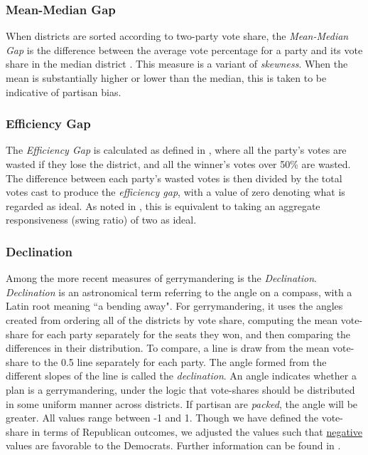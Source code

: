             \subsubsection*{Mean-Median Gap}
    When districts are sorted according to two-party vote share, the \textit{Mean-Median Gap} is the difference between the average vote percentage for a party and its vote share in the median district \citep[see][]{Best2018}. This measure is a variant of \textit{skewness}. When the mean is substantially higher or lower than the median, this is taken to be indicative of partisan bias.
\par
            \subsubsection*{Efficiency Gap}
    The \textit{Efficiency Gap} is calculated as defined in \citet{Stephanopoulos2014_UofChicagoLaw}, where all the party’s votes are wasted if they lose the district, and all the winner’s votes over 50\% are wasted. The difference between each party’s wasted votes is then divided by the total votes cast to produce the \textit{efficiency gap}, with a value of zero denoting what is regarded as ideal. As noted in \citet[][p. 13]{Best2018}, this is equivalent to taking an aggregate responsiveness (swing ratio) of two as ideal. 
\par
            \subsubsection*{Declination}
    Among the more recent measures of gerrymandering is the \textit{Declination}. \textit{Declination} is an astronomical term referring to the angle on a compass, with a Latin root meaning ``a bending away". For gerrymandering, it uses the angles created from ordering all of the districts by vote share, computing the mean vote-share for each party separately for the seats they won, and then comparing the differences in their distribution. To compare, a line is draw from the mean vote-share to the 0.5 line separately for each party. The angle formed from the different slopes of the line is called the \textit{declination}. An angle indicates whether a plan is a gerrymandering, under the logic that vote-shares should be distributed in some uniform manner across districts. If partisan are \textit{packed}, the angle will be greater. All values range between -1 and 1. Though we have defined the vote-share in terms of Republican outcomes, we adjusted the values such that \underline{negative} values are favorable to the Democrats. Further information can be found in \citet{Warrington2018}.  
\par
